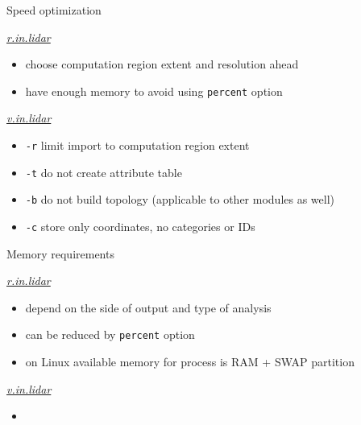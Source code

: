 \documentclass[xcolor={dvipsnames,usenames},beamer,aspectratio=169]{beamer}
\newcommand{\gmodule}[1]{\href{http://grass.osgeo.org/grass71/manuals/#1.html}{\emph{#1}}}
\begin{document}
\begin{frame}{Speed optimization}

\begin{block}{\gmodule{r.in.lidar}}
 \begin{itemize}
  \item choose computation region extent and resolution ahead
  \item have enough memory to avoid using \texttt{percent} option
 \end{itemize}
\end{block}


\begin{block}{\gmodule{v.in.lidar}}
 \begin{itemize}
  \item \texttt{-r} limit import to computation region extent
  \item \texttt{-t} do not create attribute table
  \item \texttt{-b} do not build topology (applicable to other modules as well)
  \item \texttt{-c} store only coordinates, no categories or IDs
 \end{itemize}
\end{block}

\end{frame}

\begin{frame}{Memory requirements}

\begin{block}{\gmodule{r.in.lidar}}
 \begin{itemize}
  \item depend on the side of output and type of analysis
  \item can be reduced by \texttt{percent} option
  \item on Linux available memory for process is RAM + SWAP partition
 \end{itemize}
\end{block}


\begin{block}{\gmodule{v.in.lidar}}
 \begin{itemize}
  \item
 \end{itemize}
\end{block}

\end{frame}
\end{document}
